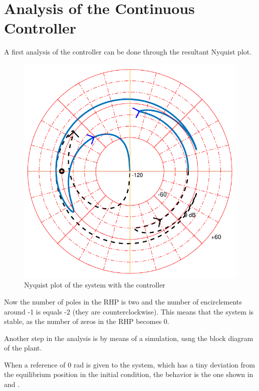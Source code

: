 \section{Analysis of the Continuous Controller}\label{analysisController}
A first analysis of the controller can be done through the resultant Nyquist plot.

\begin{figure}[H] 
	\centering 
	\includegraphics[scale=0.46]{figures/nyquistController}	
	\caption{Nyquist plot of the system with the controller}
	\label{nyquistController}
\end{figure}

Now the number of poles in the RHP is two and the number of encirclements around -1 is equals -2 (they are counterclockwise). This means that the system is stable, as the number of zeros in the RHP becomes 0.

Another step in the analysis is by means of a simulation, usng the block diagram of the plant.


When a reference of 0 rad is given to the system, which has a tiny deviation from the equilibrium position in the initial condition, the behavior is the one shown in  and .

